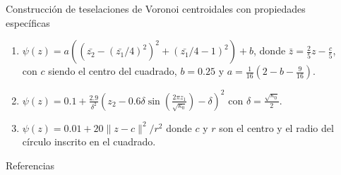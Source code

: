 \documentclass[final]{beamer}
\newlength{\sepwidth}
\newlength{\colwidth}
\newcommand{\separatorcolumn}{\begin{column}{\sepwidth}\end{column}}
\begin{document}
\begin{frame}[t]
\begin{columns}[t]
\begin{column}{\colwidth}
\begin{block}{Construcción de teselaciones de Voronoi centroidales con propiedades específicas}
\begin{enumerate}
\begin{enumerate}[a]
\item $\psi(z) = a((\bar{z_2}-(\bar{z_1}/4)^2)^2 + (\bar{z_1}/4-1)^2) + b$, donde $\bar{z} = \frac{2}{5}z-\frac{c}{5}$, con $c$ siendo el centro del cuadrado, $b=0.25$ y $a = \frac{1}{16}(2-b-\frac{9}{16})$.
\item $\psi(z) = 0.1 + \frac{2.9}{\delta^2}\left(z_2-0.6\delta \sin(\frac{2\pi z_1}{\sqrt{\kappa_0}}) - \delta \right)^2$ con $\delta=\frac{\sqrt{\kappa_0}}{2}$.
\item $\psi(z)=0.01 + 20\| z-c\|^2/r^2$ donde $c$ y $r$ son el centro y el radio del círculo inscrito en el cuadrado.
\end{enumerate}
\end{enumerate}

\end{block}

  \begin{block}{Referencias}

    \nocite{*}
    \footnotesize{}

  \end{block}

\end{column}
\separatorcolumn

\end{columns}
\end{frame}
\end{document}

